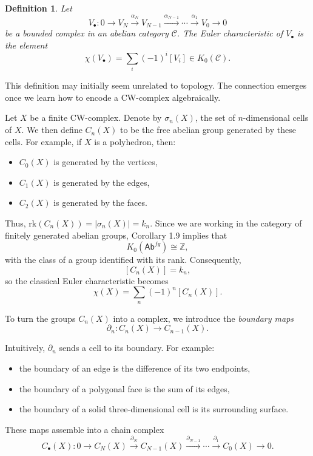\documentclass[12pt,reqno]{amsart}
\theoremstyle{plain}
\newtheorem{defn}[thm]{Definition}
\numberwithin{equation}{section}
\begin{document}
\begin{defn}
Let
\[
V_\bullet:
0\longrightarrow
V_N
\xrightarrow{\alpha_N}
V_{N-1}
\xrightarrow{\alpha_{N-1}}
\cdots
\xrightarrow{\alpha_1}
V_0
\longrightarrow 0
\]
be a bounded complex in an abelian category $\mathcal C$. The \emph{Euler characteristic} of $V_\bullet$ is the element
\[
\chi(V_\bullet)
=
\sum_i (-1)^i [V_i]
\in
K_0(\mathcal C).
\]
\end{defn}

This definition may initially seem unrelated to topology. The connection emerges once we learn how to encode a CW-complex algebraically.

Let $X$ be a finite CW-complex. Denote by $\sigma_n(X)$, the set of $n$-dimensional cells of $X$. We then define $C_n(X)$ to be the free abelian group generated by these cells.
For example, if $X$ is a polyhedron, then:
\begin{itemize}
    \item $C_0(X)$ is generated by the vertices,
    \item $C_1(X)$ is generated by the edges,
    \item $C_2(X)$ is generated by the faces.
\end{itemize}

Thus, $\mathrm{rk}(C_n(X)) = |\sigma_n(X)| = k_n$.
Since we are working in the category of finitely generated abelian groups, Corollary 1.9 implies that
\[
K_0(\mathsf{Ab}^{fg})\cong \mathbb Z,
\]
with the class of a group identified with its rank. Consequently,
\[
[C_n(X)] = k_n,
\]
so the classical Euler characteristic becomes
\[
\chi(X)=\sum_n (-1)^n [C_n(X)].
\]

To turn the groups $C_n(X)$ into a complex, we introduce the \emph{boundary maps}
\[
\partial_n:C_n(X)\to C_{n-1}(X).
\]

Intuitively, $\partial_n$ sends a cell to its boundary. For example:
\begin{itemize}
    \item the boundary of an edge is the difference of its two endpoints,
    \item the boundary of a polygonal face is the sum of its edges,
    \item the boundary of a solid three-dimensional cell is its surrounding surface.
\end{itemize}

These maps assemble into a chain complex
\[
C_\bullet(X):
0\longrightarrow
C_N(X)
\xrightarrow{\partial_N}
C_{N-1}(X)
\xrightarrow{\partial_{N-1}}
\cdots
\xrightarrow{\partial_1}
C_0(X)
\longrightarrow 0.
\]
\end{document}
